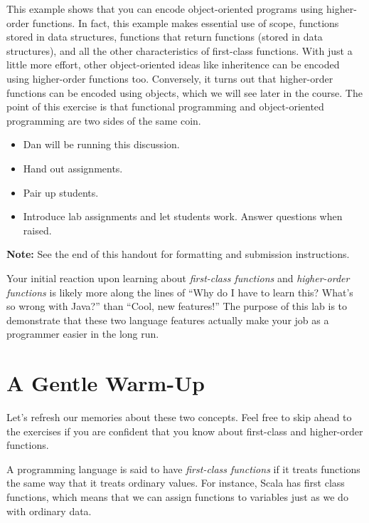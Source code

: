 \documentclass{book}
\begin{document}
This example shows that you can encode object-oriented programs using
higher-order functions. In fact, this example makes essential use of
scope, functions stored in data structures, functions that return
functions (stored in data structures), and all the other characteristics
of first-class functions. With just a little more effort, other object-oriented
ideas like inheritence can be encoded using higher-order functions too.
Conversely, it turns out that higher-order functions can be encoded using
objects, which we will see later in the course. The point of this exercise
is that functional programming and object-oriented programming are two sides
of the same coin.


\begin{instructor}
  \begin{itemize}
    \item Dan will be running this discussion.
    \item Hand out assignments.
    \item Pair up students.
    \item Introduce lab assignments and let students work.  Answer questions when raised.
  \end{itemize}
\end{instructor}

\textbf{Note:} See the end of this handout for formatting and submission instructions.

Your initial reaction upon learning about \emph{first-class functions} and \emph{higher-order functions} is likely more along the lines of ``Why do I have to learn this?  What's so wrong with Java?'' than ``Cool, new features!''  The purpose of this lab is to demonstrate that these two language features actually make your job as a programmer easier in the long run.

\section{A Gentle Warm-Up}

Let's refresh our memories about these two concepts.  Feel free to skip ahead to the exercises if you are confident that you know about first-class and higher-order functions.

A programming language is said to have \emph{first-class functions} if it treats functions the same way that it treats ordinary values.  For instance, Scala has first class functions, which means that we can assign functions to variables just as we do with ordinary data.
\end{document}
